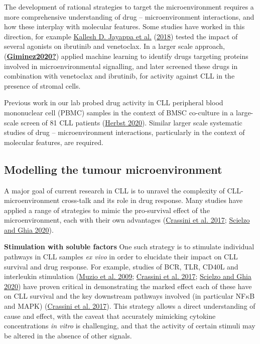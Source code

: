 \documentclass[11pt, a4paper, twosided]{book}
\begin{document}
The development of rational strategies to target the microenvironment requires a more comprehensive understanding of drug -- microenvironment interactions, and how these interplay with molecular features. Some studies have worked in this direction, for example \protect\hyperlink{ref-Jayappa2018}{Kallesh D. Jayappa et al.} (\protect\hyperlink{ref-Jayappa2018}{2018}) tested the impact of several agonists on ibrutinib and venetoclax. In a larger scale approach, (\protect\hyperlink{ref-Giminez2020}{\textbf{Giminez2020?}}) applied machine learning to identify drugs targeting proteins involved in microenvironmental signalling, and later screened these drugs in combination with venetoclax and ibrutinib, for activity against CLL in the presence of stromal cells.

Previous work in our lab probed drug activity in CLL peripheral blood mononuclear cell (PBMC) samples in the context of BMSC co-culture in a large-scale screen of 81 CLL patients (\protect\hyperlink{ref-HerbstThesis}{Herbst 2020}). Similar larger scale systematic studies of drug -- microenvironment interactions, particularly in the context of molecular features, are required.

\hypertarget{modelling-microenvironment-intro}{%
\subsection{Modelling the tumour microenvironment}\label{modelling-microenvironment-intro}}

A major goal of current research in CLL is to unravel the complexity of CLL-microenvironment cross-talk and its role in drug response. Many studies have applied a range of strategies to mimic the pro-survival effect of the microenvironment, each with their own advantages (\protect\hyperlink{ref-Crassini2017}{Crassini et al. 2017}; \protect\hyperlink{ref-Scielzo2020}{Scielzo and Ghia 2020}).

\textbf{Stimulation with soluble factors}
One such strategy is to stimulate individual pathways in CLL samples \emph{ex vivo} in order to elucidate their impact on CLL survival and drug response. For example, studies of BCR, TLR, CD40L and interleukin stimulation (\protect\hyperlink{ref-Muzio2009}{Muzio et al. 2009}; \protect\hyperlink{ref-Crassini2017}{Crassini et al. 2017}; \protect\hyperlink{ref-Scielzo2020}{Scielzo and Ghia 2020}) have proven critical in demonstrating the marked effect each of these have on CLL survival and the key downstream pathways involved (in particular NF\(\kappa\)B and MAPK) (\protect\hyperlink{ref-Crassini2017}{Crassini et al. 2017}). This strategy allows a direct understanding of cause and effect, with the caveat that accurately mimicking cytokine concentrations \emph{in vitro} is challenging, and that the activity of certain stimuli may be altered in the absence of other signals.
\end{document}
